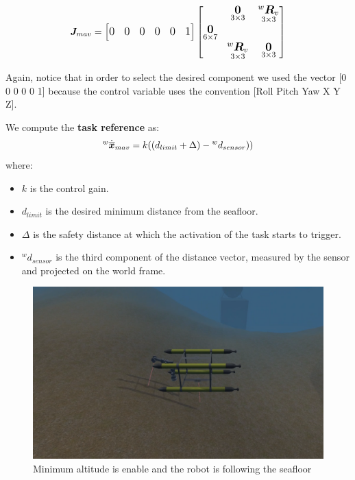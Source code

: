 \documentclass{article}
\begin{document}
\begin{equation}
\large
\boldsymbol{J}_{mav}=\begin{bmatrix} 0 & 0 & 0 & 0 & 0 & 1
\end{bmatrix}
    \begin{bmatrix}
     & \underset{3\times 3}{\boldsymbol{0}} & \underset{ 3\times 3}{^{w}\boldsymbol{R}_{v}} \\
     \underset{ 6\times 7}{\boldsymbol{0}} \\
     & \underset{ 3\times 3}{^{w}\boldsymbol{R}_{v}} & \underset{3\times 3}{\boldsymbol{0}} \\
    \end{bmatrix}
\end{equation}

Again, notice that in order to select the desired component we used the vector [0 0 0 0 0 1] because the control variable uses the convention [Roll Pitch Yaw X Y Z].

\noindent
\vspace{5px}
We compute the \textbf{task reference} as: 
\begin{equation}
\large
    ^{w}\dot{\overline{\boldsymbol{x}}}_{mav} = k((d_{limit}+\Delta)- {^w}d_{sensor})) %
\end{equation}
where:
\begin{itemize}
    \item $k$ is the control gain.
    \item $d_{limit}$ is the desired minimum distance from the seafloor.
    \item $ \Delta $ is the safety distance at which the activation of the task starts to trigger.
    \item $^w d_{sensor}$ is the third component  of the distance vector, measured by the sensor and projected on the world frame.
\end{itemize} 

\begin{figure}[t]
    \centering
    \includegraphics[scale=0.4]{122_MAV1m.png}
    \caption{Minimum altitude is enable and the robot is following the seafloor}
    \label{images_2_1}
\end{figure}
\end{document}
